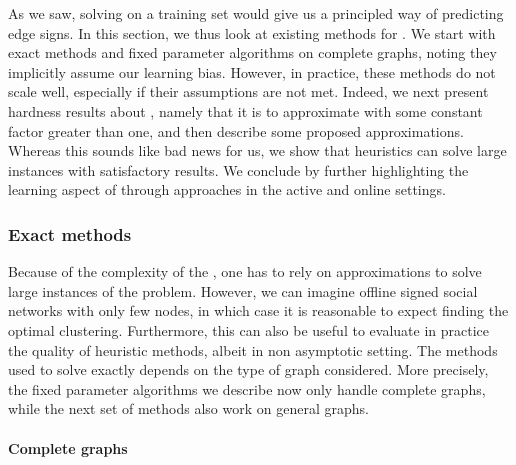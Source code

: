 As we saw, solving \pcc{} on a training set would give us a principled way of predicting edge signs.
In this section, we thus look at existing methods for \pcc{}. We start with exact methods and fixed
parameter algorithms on complete graphs, noting they implicitly assume our learning bias. However,
in practice, these methods do not scale well, especially if their assumptions are not met. Indeed,
we next present hardness results about \pcc{}, namely that it is \NPh{} to approximate with some
constant factor greater than one, and then describe some proposed approximations. Whereas this
sounds like bad news for us, we show that heuristics can solve large instances with satisfactory
results. We conclude by further highlighting the learning aspect of \pcc{} through approaches in
the active and online settings.

\subsubsection{Exact methods}
\label{ssub:cc_exact_methods}

Because of the complexity of the \pcc{}, one has to rely on approximations to solve large instances
of the problem. However, we can imagine offline signed social networks with only few nodes, in which
case it is reasonable to expect finding the optimal clustering. Furthermore, this can also be useful
to evaluate in practice the quality of heuristic methods, albeit in non asymptotic setting. The
methods used to solve \pcc{} exactly depends on the type of graph considered. More precisely, the
fixed parameter algorithms we describe now only handle complete graphs, while the next set of
methods also work on general graphs.

\paragraph{Complete graphs}
\label{par:cc_editing}


